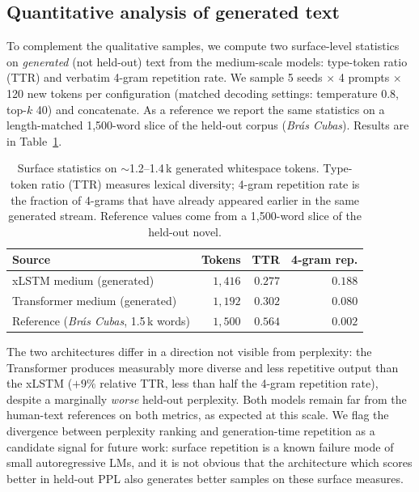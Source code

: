 \documentclass[11pt]{article}
\begin{document}
\subsection{Quantitative analysis of generated text}\label{sec:gentext}

To complement the qualitative samples, we compute two surface-level
statistics on \emph{generated} (not held-out) text from the medium-scale
models: type-token ratio (TTR) and verbatim 4-gram repetition rate. We
sample 5 seeds $\times$ 4 prompts $\times$ 120 new tokens per
configuration (matched decoding settings: temperature 0.8, top-$k$ 40)
and concatenate. As a reference we report the same statistics on a
length-matched 1{,}500-word slice of the held-out corpus
(\emph{Brás Cubas}). Results are in Table~\ref{tab:gentext}.

\begin{table}[h]
\centering
\caption{Surface statistics on $\sim$1.2--1.4\,k generated whitespace
  tokens. Type-token ratio (TTR) measures lexical diversity; 4-gram
  repetition rate is the fraction of 4-grams that have already appeared
  earlier in the same generated stream. Reference values come from a
  1{,}500-word slice of the held-out novel.}
\label{tab:gentext}
\small
\begin{tabular}{lrrr}
\toprule
Source & Tokens & TTR & 4-gram rep. \\
\midrule
xLSTM medium (generated)       & $1{,}416$ & $0.277$ & $0.188$ \\
Transformer medium (generated) & $1{,}192$ & $0.302$ & $0.080$ \\
\midrule
Reference (\emph{Brás Cubas}, 1.5\,k words) & $1{,}500$ & $0.564$ & $0.002$ \\
\bottomrule
\end{tabular}
\end{table}

The two architectures differ in a direction not visible from
perplexity: the Transformer produces measurably more diverse and less
repetitive output than the xLSTM ($+9\%$ relative TTR, less than
half the 4-gram repetition rate), despite a marginally \emph{worse}
held-out perplexity. Both models remain far from the human-text
references on both metrics, as expected at this scale. We flag the
divergence between perplexity ranking and generation-time repetition as
a candidate signal for future work: surface repetition is a known
failure mode of small autoregressive LMs, and it is not obvious that
the architecture which scores better in held-out PPL also generates
better samples on these surface measures.
\end{document}
